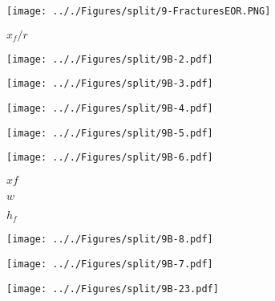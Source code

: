 \documentclass[onecolumn,11pt]{report}
\def\lthtmlcheckvsize{\ifdim\ht\sizebox<\vsize 
  \ifdim\wd\sizebox<\hsize\expandafter\hfill\fi \expandafter\vfill
  \else\expandafter\vss\fi}%
\begin{document}
{\newpage\clearpage
{}%
\texttt{[image: .././Figures/split/9-FracturesEOR.PNG]}%
\lthtmlpictureZ
\lthtmlcheckvsize\clearpage}

{\newpage\clearpage
{}%
$ x_f/r$%
\lthtmlindisplaymathZ
\lthtmlcheckvsize\clearpage}

{\newpage\clearpage
{}%
\texttt{[image: .././Figures/split/9B-2.pdf]}%
\lthtmlpictureZ
\lthtmlcheckvsize\clearpage}

{\newpage\clearpage
{}%
\texttt{[image: .././Figures/split/9B-3.pdf]}%
\lthtmlpictureZ
\lthtmlcheckvsize\clearpage}

{\newpage\clearpage
{}%
\texttt{[image: .././Figures/split/9B-4.pdf]}%
\lthtmlpictureZ
\lthtmlcheckvsize\clearpage}

{\newpage\clearpage
{}%
\texttt{[image: .././Figures/split/9B-5.pdf]}%
\lthtmlpictureZ
\lthtmlcheckvsize\clearpage}

{\newpage\clearpage
{}%
\texttt{[image: .././Figures/split/9B-6.pdf]}%
\lthtmlpictureZ
\lthtmlcheckvsize\clearpage}

{\newpage\clearpage
{}%
$ xf$%
\lthtmlindisplaymathZ
\lthtmlcheckvsize\clearpage}

{\newpage\clearpage
{}%
$ w$%
\lthtmlindisplaymathZ
\lthtmlcheckvsize\clearpage}

{\newpage\clearpage
{}%
$ h_f$%
\lthtmlindisplaymathZ
\lthtmlcheckvsize\clearpage}

{\newpage\clearpage
{}%
\texttt{[image: .././Figures/split/9B-8.pdf]}%
\lthtmlpictureZ
\lthtmlcheckvsize\clearpage}

{\newpage\clearpage
{}%
\texttt{[image: .././Figures/split/9B-7.pdf]}%
\lthtmlpictureZ
\lthtmlcheckvsize\clearpage}

{\newpage\clearpage
{}%
\texttt{[image: .././Figures/split/9B-23.pdf]}%
\lthtmlpictureZ
\lthtmlcheckvsize\clearpage}
\end{document}
